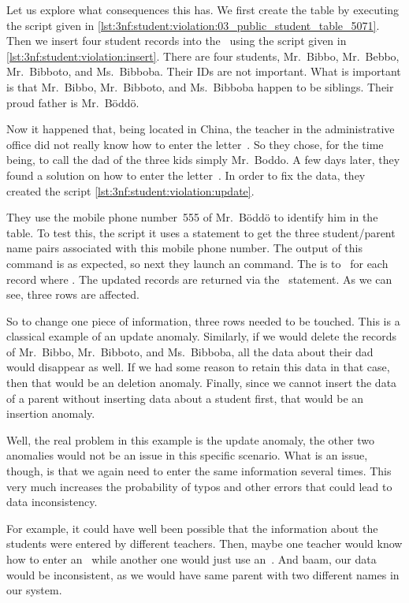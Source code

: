 Let us explore what consequences this has.
We first create the table by executing the script given in \cref{lst:3nf:student:violation:03_public_student_table_5071}.
Then we insert four student records into the \db\ using the script given in \cref{lst:3nf:student:violation:insert}.
There are four students, Mr.~Bibbo, Mr.~Bebbo, Mr.~Bibboto, and Ms.~Bibboba.
Their IDs are not important.
What is important is that Mr.~Bibbo, Mr.~Bibboto, and Ms.~Bibboba happen to be siblings.
Their proud father is Mr.~B{\"o}dd{\"o}.

Now it happened that, being located in China, the teacher in the administrative office did not really know how to enter the letter~.
So they chose, for the time being, to call the dad of the three kids simply Mr.~Boddo.
A few days later, they found a solution on how to enter the letter~.
In order to fix the data, they created the script \cref{lst:3nf:student:violation:update}.

They use the mobile phone number~555 of Mr.~B{\"o}dd{\"o} to identify him in the table.
To test this, the script it uses a  statement to get the three student/parent name pairs associated with this mobile phone number.
The output of this command is as expected, so next they launch an  command.
The  is  to~ for each record where .
The updated records are returned via the~ statement.
As we can see, three rows are affected.

So to change one piece of information, three rows needed to be touched.
This is a classical example of an update anomaly.
Similarly, if we would delete the records of Mr.~Bibbo, Mr.~Bibboto, and Ms.~Bibboba, all the data about their dad would disappear as well.
If we had some reason to retain this data in that case, then that would be an deletion anomaly.
Finally, since we cannot insert the data of a parent without inserting data about a student first, that would be an insertion anomaly.

Well, the real problem in this example is the update anomaly, the other two anomalies would not be an issue in this specific scenario.
What is an issue, though, is that we again need to enter the same information several times.
This very much increases the probability of typos and other errors that could lead to data inconsistency.

For example, it could have well been possible that the information about the students were entered by different teachers.
Then, maybe one teacher would know how to enter an~ while another one would just use an~.
And baam, our data would be inconsistent, as we would have same parent with two different names in our system.%
%
\FloatBarrier%
\endhsection%
%
